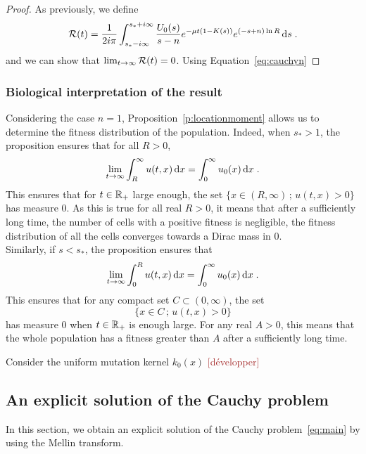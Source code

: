 \documentclass[11pt]{amsart}
\newcommand{\R}{\RR}
\newcommand{\diff}{\,\mathrm{d}}
\newcommand{\ndr}[1]{\textcolor{brown}{[#1]}}
\begin{document}
\begin{proof}
        As previously, we define
        \begin{align*}
            \Rcal(t) = \frac{1}{2i\pi} \int_{s_*-i\infty}^{s_*+i\infty} \frac{U_0(s)}{s-n} e^{-\mu t(1 - K(s))} e^{(-s+n)\ln R} \diff s
            \eqfinp
        \end{align*}
        and we can show that $\lim_{t\to\infty}\mathcal{R}(t) = 0$. Using Equation~\ref{eq:cauchyn}
         \end{proof}

        
        \subsubsection{Biological interpretation of the result}
        Considering the case $n = 1$, Proposition~\ref{p:locationmoment} allows us to determine the fitness distribution of the population. Indeed, when $s_* > 1$, the proposition ensures that for all $R > 0$, 
        \begin{align*}
            \lim_{t \to \infty} \int_R^\infty u(t,x) \diff x = \int_0^\infty u_0(x) \diff x \eqfinp
        \end{align*} 
        This ensures that for $t \in \mathbb{R}_+$ large enough, the set $\{ x \in (R, \infty) \,;\, u(t,x) > 0\}$ has measure $0$. As this is true for all real $R > 0$, it means that after a sufficiently long time, the number of cells with a positive fitness is negligible, \ie the fitness distribution of all the cells converges towards a Dirac mass in 0. \\

        Similarly, if $s<s_*$, the proposition ensures that 
        \begin{align*}
            \lim_{t \to \infty} \int_0^R u(t,x) \diff x = \int_0^\infty u_0(x) \diff x \eqfinp
        \end{align*} 
        This ensures that for any compact set $ C \subset (0, \infty)$, the set  $$\{ x \in C \,;\, u(t,x) > 0\}$$ has measure $0$ when $t \in \R_+$ is enough large. For any real $A > 0$, this means that the whole population has a fitness greater than $A$ after a sufficiently long time.

        \begin{example}
            Consider the uniform mutation kernel $k_0(x)$
            \ndr{développer}
        \end{example}

    \subsection{An explicit solution of the Cauchy problem}
    \label{s:explicit}
    In this section, we obtain an explicit solution of the Cauchy problem~\eqref{eq:main} by using the Mellin transform.
    
\end{document}
